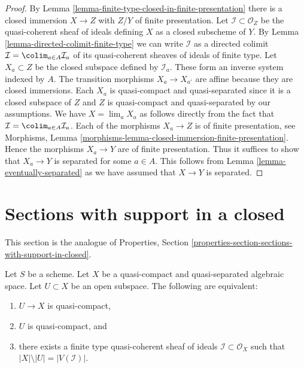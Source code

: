 \begin{proof}
By Lemma \ref{lemma-finite-type-closed-in-finite-presentation}
there is a closed immersion $X \to Z$ with $Z/Y$ of
finite presentation. Let $\mathcal{I} \subset \mathcal{O}_Z$
be the quasi-coherent sheaf of ideals defining $X$ as a closed
subscheme of $Y$. By
Lemma \ref{lemma-directed-colimit-finite-type}
we can write $\mathcal{I}$ as a directed colimit
$\mathcal{I} = \colim_{a \in A} \mathcal{I}_a$ of its
quasi-coherent sheaves of ideals of finite type.
Let $X_a \subset Z$ be the closed subspace defined by $\mathcal{I}_a$.
These form an inverse system indexed by $A$.
The transition morphisms $X_a \to X_{a'}$ are affine because
they are closed immersions. Each $X_a$ is quasi-compact and quasi-separated
since it is a closed subspace of $Z$ and $Z$ is quasi-compact and
quasi-separated by our assumptions.
We have $X = \lim_a X_a$ as follows directly from the
fact that $\mathcal{I} = \colim_{a \in A} \mathcal{I}_a$.
Each of the morphisms $X_a \to Z$ is of finite presentation, see
Morphisms, Lemma \ref{morphisms-lemma-closed-immersion-finite-presentation}.
Hence the morphisms $X_a \to Y$ are of finite presentation.
Thus it suffices to show that $X_a \to Y$ is separated for some
$a \in A$. This follows from Lemma \ref{lemma-eventually-separated}
as we have assumed that $X \to Y$ is separated.
\end{proof}






\section{Sections with support in a closed}
\label{section-sections-with-support-in-closed}

\noindent
This section is the analogue of
Properties, Section \ref{properties-section-sections-with-support-in-closed}.

\begin{lemma}
\label{lemma-quasi-coherent-finite-type-ideals}
Let $S$ be a scheme.
Let $X$ be a quasi-compact and quasi-separated algebraic space.
Let $U \subset X$ be an open subspace. The following are equivalent:
\begin{enumerate}
\item $U \to X$ is quasi-compact,
\item $U$ is quasi-compact, and
\item there exists a finite type quasi-coherent sheaf of ideals
$\mathcal{I} \subset \mathcal{O}_X$ such that
$|X| \setminus |U| = |V(\mathcal{I})|$.
\end{enumerate}
\end{lemma}

